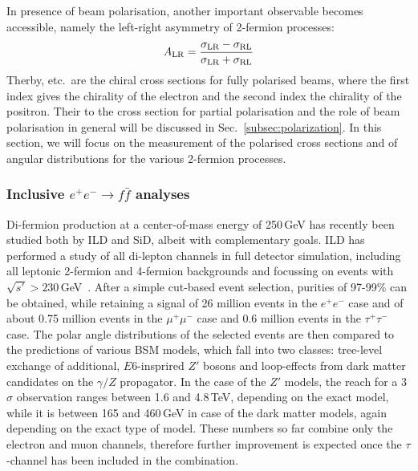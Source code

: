 In presence of beam polarisation, another important observable becomes accessible, namely the left-right asymmetry of 2-fermion processes:
\begin{equation}
A_{\mathrm{LR}} = \frac{\sigma_{\mathrm{LR}}-\sigma_{\mathrm{RL}}}{\sigma_{\mathrm{LR}}+\sigma_{\mathrm{RL}}}
\label{eq:defALR}
\end{equation}
Therby, \sigmaLR etc.\ are the chiral cross sections for fully polarised beams, where the first index gives the chirality of the electron and the second index the chirality of the positron. Their to the cross section for partial polarisation and the role of beam polarisation in general will be discussed in Sec.~\ref{subsec:polarization}. In this section, we will focus on the measurement of
the polarised cross sections and of angular distributions for the various 2-fermion processes.


\subsubsection{Inclusive $e^+e^- \to f\bar{f}$ analyses}
Di-fermion production at a center-of-mass energy of 250\,GeV has recently been studied both by ILD and SiD, albeit with complementary goals. ILD has performed a study of all di-lepton channels in full detector simulation, including all leptonic 2-fermion and 4-fermion backgrounds and focussing on events with $\sqrt{s'}>230$\,GeV~\cite{bib:deguchi_lcws18, Yamashiro:2018ant}. After a simple cut-based event selection, purities of 97-99\% can be obtained, while retaining a signal of 26 million events in the $e^+e^-$ case and of about 0.75 million events in the $\mu^+\mu^-$ case and 0.6 million events in the $\tau^+\tau^-$ case. The polar angle distributions of the selected events are then compared to the predictions of various BSM models, which fall into two classes: tree-level exchange of additional, $E6$-insprired $Z'$ bosons and loop-effects from dark matter candidates on the $\gamma/Z$ propagator. In the case of the $Z'$ models, the reach for a 3$\sigma$ observation ranges between 1.6 and 4.8\,TeV, depending on the exact model, while it is between 165 and 460\,GeV in case of the dark matter models, again depending on the exact type of model. These numbers so far combine only the electron and muon channels, therefore further improvement is expected once the $\tau$-channel has been included in the combination.

